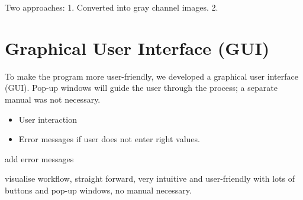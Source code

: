 %
%
%
%
%
%


Two approaches:
1.
Converted into gray channel images.
2.


\section{Graphical User Interface (GUI)}

To make the program more user-friendly, we developed a graphical user interface (GUI). Pop-up windows will guide the user through the process; a separate manual was not necessary.

\begin{itemize}
	\item User interaction
	\item Error messages if user does not enter right values.
\end{itemize}


add error messages

visualise workflow, straight forward, very intuitive and user-friendly with lots of buttons and pop-up windows, no manual necessary.

